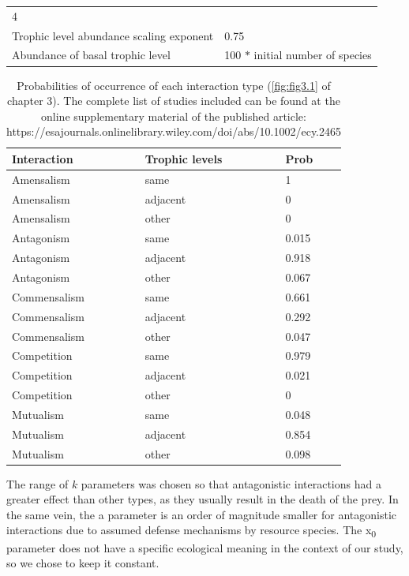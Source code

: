 \begin{longtable}[]{@{}ll@{}}
\begin{minipage}[t]{0.55\columnwidth}
4\strut
\end{minipage}\tabularnewline
\begin{minipage}[t]{0.39\columnwidth}\raggedright\strut
Trophic level abundance scaling exponent\strut
\end{minipage} & \begin{minipage}[t]{0.55\columnwidth}\raggedright\strut
0.75\strut
\end{minipage}\tabularnewline
\begin{minipage}[t]{0.39\columnwidth}\raggedright\strut
Abundance of basal trophic level\strut
\end{minipage} & \begin{minipage}[t]{0.55\columnwidth}\raggedright\strut
100 \(*\) initial number of species\strut
\end{minipage}\tabularnewline
\bottomrule
\end{longtable}

\newpage

\begin{longtable}[]{@{}lll@{}}
\caption[Interaction probabilities]{\color{Gray}Probabilities of occurrence of each interaction type (\cref{fig:fig3.1} of chapter 3). The complete list of studies included can be found at the online supplementary material of the published article: https://esajournals.onlinelibrary.wiley.com/doi/abs/10.1002/ecy.2465}
\label{tab:tableApp3.1.2}\\
\toprule
Interaction & Trophic levels & Prob\tabularnewline
\midrule
\endhead
Amensalism & same & 1\tabularnewline
Amensalism & adjacent & 0\tabularnewline
Amensalism & other & 0\tabularnewline
Antagonism & same & 0.015\tabularnewline
Antagonism & adjacent & 0.918\tabularnewline
Antagonism & other & 0.067\tabularnewline
Commensalism & same & 0.661\tabularnewline
Commensalism & adjacent & 0.292\tabularnewline
Commensalism & other & 0.047\tabularnewline
Competition & same & 0.979\tabularnewline
Competition & adjacent & 0.021\tabularnewline
Competition & other & 0\tabularnewline
Mutualism & same & 0.048\tabularnewline
Mutualism & adjacent & 0.854\tabularnewline
Mutualism & other & 0.098\tabularnewline
\bottomrule
\end{longtable}


The range of $k$ parameters was chosen so that antagonistic interactions had a greater effect than other types, as they usually result in the death of the prey. In the same vein, the a parameter is an order of magnitude smaller for antagonistic interactions due to assumed defense mechanisms by resource species. The x\textsubscript{0} parameter does not have a specific ecological meaning in the context of our study, so we chose to keep it constant.

